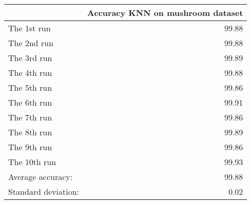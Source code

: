 \begin{tabular}{lr}
\toprule
{} &  Accuracy KNN on mushroom dataset \\
\midrule
The 1st run         &                             99.88 \\
The 2nd run         &                             99.88 \\
The 3rd run         &                             99.89 \\
The 4th run         &                             99.88 \\
The 5th run         &                             99.86 \\
The 6th run         &                             99.91 \\
The 7th run         &                             99.86 \\
The 8th run         &                             99.89 \\
The 9th run         &                             99.86 \\
The 10th run        &                             99.93 \\
Average accuracy:   &                             99.88 \\
Standard deviation: &                              0.02 \\
\bottomrule
\end{tabular}
